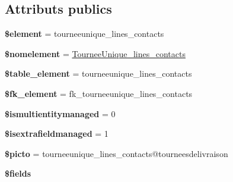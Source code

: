 \subsection*{Attributs publics}
\begin{DoxyCompactItemize}
\item 
\mbox{\label{classTourneeUnique__lines__contacts_a872d6bf8c2d48900429dedce74e70785}} 
{\bfseries \$element} = \textquotesingle{}tourneeunique\+\_\+lines\+\_\+contacts\textquotesingle{}
\item 
\mbox{\label{classTourneeUnique__lines__contacts_afa7434bfb7277d82ff1c7a928f42ad72}} 
{\bfseries \$nomelement} = \textquotesingle{}\hyperlink{classTourneeUnique__lines__contacts}{Tournee\+Unique\+\_\+lines\+\_\+contacts}\textquotesingle{}
\item 
\mbox{\label{classTourneeUnique__lines__contacts_a3efedcc485afe76df8df7c6788c3bd24}} 
{\bfseries \$table\+\_\+element} = \textquotesingle{}tourneeunique\+\_\+lines\+\_\+contacts\textquotesingle{}
\item 
\mbox{\label{classTourneeUnique__lines__contacts_ac7cea0623dea987090c324b7b56ba9b5}} 
{\bfseries \$fk\+\_\+element} = \textquotesingle{}fk\+\_\+tourneeunique\+\_\+lines\+\_\+contacts\textquotesingle{}
\item 
\mbox{\label{classTourneeUnique__lines__contacts_ae2b1c50b80e446b9acea28e788289500}} 
{\bfseries \$ismultientitymanaged} = 0
\item 
\mbox{\label{classTourneeUnique__lines__contacts_a09651dbdfc789ef5b3d02010374b027c}} 
{\bfseries \$isextrafieldmanaged} = 1
\item 
\mbox{\label{classTourneeUnique__lines__contacts_a780951688076136f1861189797e2735d}} 
{\bfseries \$picto} = \textquotesingle{}tourneeunique\+\_\+lines\+\_\+contacts@tourneesdelivraison\textquotesingle{}
\item 
{\bfseries \$fields}
\item 
\mbox{\label{classTourneeUnique__lines__contacts_a1293fca4e6c022490e734fb829b7bcd4}} 

\end{DoxyCompactItemize}
